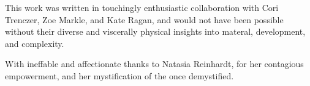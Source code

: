 \documentclass[11pt]{article}
\begin{document}
\vspace*{12\baselineskip}

\begingroup
\begin{center}
This work was written in touchingly enthusiastic collaboration with Cori Trenczer, Zoe Markle, and Kate Ragan, and would not have been possible without their diverse and viscerally physical insights into materal, development, and complexity.
\end{center}
\endgroup

\vspace*{4\baselineskip}

\begingroup
\begin{center}
With ineffable and affectionate thanks to Natasia Reinhardt, for her contagious empowerment, and her mystification of the once demystified.
\end{center}
\endgroup
\end{document}
